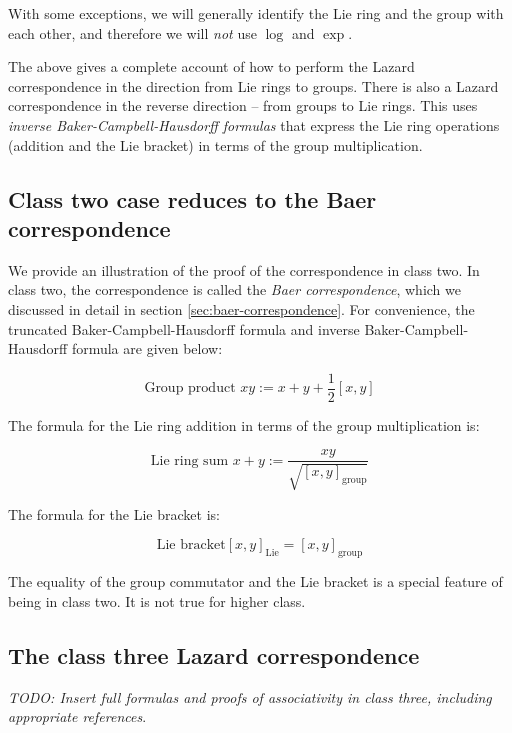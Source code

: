 With some exceptions, we will generally identify the Lie ring and the
group with each other, and therefore we will {\em not} use $\log$ and
$\exp$.

The above gives a complete account of how to perform the Lazard
correspondence in the direction from Lie rings to groups. There is
also a Lazard correspondence in the reverse direction -- from groups
to Lie rings. This uses {\em inverse Baker-Campbell-Hausdorff
  formulas} that express the Lie ring operations (addition and the Lie
bracket) in terms of the group multiplication.

\subsection{Class two case reduces to the Baer correspondence}

We provide an illustration of the proof of the correspondence in class
two. In class two, the correspondence is called the {\em Baer
  correspondence}, which we discussed in detail in section
\ref{sec:baer-correspondence}. For convenience, the truncated
Baker-Campbell-Hausdorff formula and inverse Baker-Campbell-Hausdorff
formula are given below:

\begin{equation*}
  \text{Group product } xy := x + y + \frac{1}{2}[x,y]
\end{equation*}

The formula for the Lie ring addition in terms of the group
multiplication is:

\begin{equation*}
  \text{Lie ring sum } x + y := \frac{xy}{\sqrt{[x,y]_{\text{group}}}}
\end{equation*}

The formula for the Lie bracket is:

\begin{equation*}
  \text{Lie bracket} [x,y]_{\text{Lie}} = [x,y]_{\text{group}}
\end{equation*}

The equality of the group commutator and the Lie bracket is a special
feature of being in class two. It is not true for higher class.

\subsection{The class three Lazard correspondence}

{\em TODO: Insert full formulas and proofs of associativity in class
  three, including appropriate references}.

